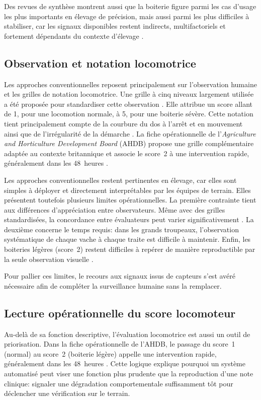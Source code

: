 Des revues de synthèse montrent aussi que la boiterie figure parmi les cas d'usage les plus
importants en élevage de précision, mais aussi parmi les plus difficiles à stabiliser, car
les signaux disponibles restent indirects, multifactoriels et fortement dépendants du
contexte d'élevage \citep{palma2025scoping,michelena2025plf_review}.

\subsection{Observation et notation locomotrice}
Les approches conventionnelles reposent principalement sur l'observation humaine et les
grilles de notation locomotrice. Une grille à cinq niveaux largement utilisée a été proposée
pour standardiser cette observation \citep{sprecher1997lameness}. Elle attribue un score allant
de 1, pour une locomotion normale, à 5, pour une boiterie sévère. Cette notation tient
principalement compte de la courbure du dos à l'arrêt et en mouvement ainsi que de
l'irrégularité de la démarche \citep{flower2006gait}. La fiche opérationnelle de
l'\textit{Agriculture and Horticulture Development Board} (AHDB) propose une grille
complémentaire adaptée au contexte britannique et associe le score~2 à une
intervention rapide, généralement dans les 48~heures
\citep{ahdb_mobility_score_sheet_48h_score2}.

Les approches conventionnelles restent pertinentes en élevage, car elles sont simples à
déployer et directement interprétables par les équipes de terrain. Elles présentent toutefois
plusieurs limites opérationnelles. La première contrainte tient aux différences d'appréciation
entre observateurs. Même avec des grilles standardisées, la concordance entre évaluateurs peut varier significativement
\citep{flower2006effect,march2007interobserver}. La deuxième concerne le temps requis:
dans les grands troupeaux, l'observation systématique de chaque vache à chaque traite est
difficile à maintenir. Enfin, les boiteries légères (score~2) restent difficiles à repérer
de manière reproductible par la seule observation visuelle
\citep{whay2003assessment,march2007interobserver}.

Pour pallier ces limites, le recours aux signaux issus de capteurs s'est avéré nécessaire afin de
compléter la surveillance humaine sans la remplacer.

\subsection{Lecture opérationnelle du score locomoteur}
Au-delà de sa fonction descriptive, l'évaluation locomotrice est aussi un outil de
priorisation. Dans la fiche opérationnelle de l'AHDB, le passage du score~1
(normal) au score~2 (boiterie légère) appelle une intervention rapide,
généralement dans les 48~heures
\citep{ahdb_mobility_score_sheet_48h_score2}. Cette logique explique
pourquoi un système automatisé peut viser une fonction plus prudente que la reproduction
d'une note clinique: signaler une dégradation comportementale suffisamment tôt pour
déclencher une vérification sur le terrain.

